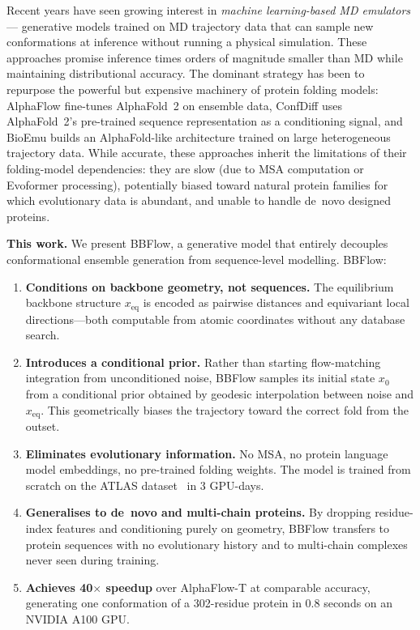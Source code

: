 \documentclass[12pt,a4paper]{article}
\newcommand{\xeq}{x_{\mathrm{eq}}}
\begin{document}
Recent years have seen growing interest in \emph{machine learning-based MD emulators}---
generative models trained on MD trajectory data that can sample new conformations at
inference without running a physical simulation.  These approaches promise inference
times orders of magnitude smaller than MD while maintaining distributional accuracy.
The dominant strategy has been to repurpose the powerful but expensive machinery of
protein folding models: AlphaFlow \citep{jing2024alphaflow} fine-tunes AlphaFold~2
on ensemble data, ConfDiff \citep{wang2024confdiff} uses AlphaFold~2's pre-trained
sequence representation as a conditioning signal, and BioEmu \citep{lewis2025bioemu}
builds an AlphaFold-like architecture trained on large heterogeneous trajectory data.
While accurate, these approaches inherit the limitations of their folding-model dependencies:
they are slow (due to MSA computation or Evoformer processing), potentially biased toward
natural protein families for which evolutionary data is abundant, and unable to handle
de~novo designed proteins.

\medskip
\noindent\textbf{This work.}
We present BBFlow, a generative model that entirely decouples conformational ensemble
generation from sequence-level modelling.  BBFlow:
\begin{enumerate}
  \item \textbf{Conditions on backbone geometry, not sequences.}  The equilibrium backbone
    structure $\xeq$ is encoded as pairwise distances and equivariant local directions---both
    computable from atomic coordinates without any database search.
  \item \textbf{Introduces a conditional prior.}  Rather than starting flow-matching integration
    from unconditioned noise, BBFlow samples its initial state $x_0$ from a conditional prior
    obtained by geodesic interpolation between noise and $\xeq$.  This geometrically biases
    the trajectory toward the correct fold from the outset.
  \item \textbf{Eliminates evolutionary information.}  No MSA, no protein language model embeddings,
    no pre-trained folding weights.  The model is trained from scratch on the ATLAS
    dataset~\citep{vandermeersche2024atlas} in 3 GPU-days.
  \item \textbf{Generalises to de~novo and multi-chain proteins.}  By dropping residue-index
    features and conditioning purely on geometry, BBFlow transfers to protein sequences with
    no evolutionary history and to multi-chain complexes never seen during training.
  \item \textbf{Achieves 40$\times$ speedup} over AlphaFlow-T at comparable accuracy, generating
    one conformation of a 302-residue protein in 0.8 seconds on an NVIDIA A100 GPU.
\end{enumerate}
\end{document}
